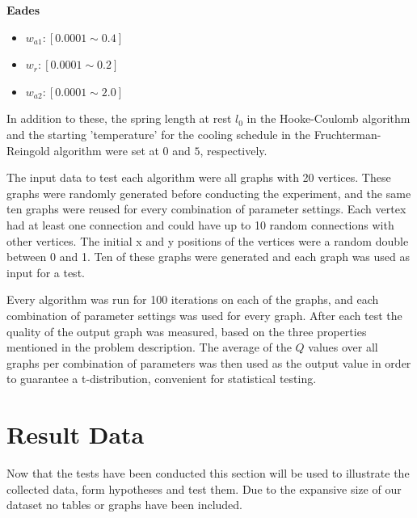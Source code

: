 \documentclass[a4paper,12pt]{article}
\begin{document}
  \textbf{Eades}
  \begin{itemize}
  	\item $w_{a1}: [0.0001 \sim 0.4]$
  	\item $w_{r}: [0.0001 \sim 0.2]$
  	\item $w_{a2}: [0.0001 \sim 2.0]$
  \end{itemize}
  
  In addition to these, the spring length at rest $l_{0}$ in the Hooke-Coulomb algorithm and the starting 'temperature' for the cooling schedule in the Fruchterman-Reingold algorithm were set at $0$ and $5$, respectively.
  
  The input data to test each algorithm were all graphs with 20 vertices. These graphs were randomly generated before conducting the experiment, and the same ten graphs were reused for every combination of parameter settings. Each vertex had at least one connection and could have up to 10 random connections with other vertices. The initial x and y positions of the vertices were a random double between 0 and 1. Ten of these graphs were generated and each graph was used as input for a test.
  
  Every algorithm was run for 100 iterations on each of the graphs, and each combination of parameter settings was used for every graph. After each test the quality of the output graph was measured, based on the three properties mentioned in the problem description. The average of the $Q$ values over all graphs per combination of parameters was then used as the output value in order to guarantee a t-distribution, convenient for statistical testing.

  \section{Result Data} %
  Now that the tests have been conducted this section will be used to illustrate the collected data, form hypotheses and test them. Due to the expansive size of our dataset no tables or graphs have been included.
  
\end{document}
